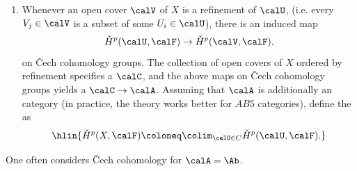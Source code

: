 \begin{definition}
\begin{enumerate}
        \item Whenever an open cover $\calV$ of $X$ is a refinement of $\calU$, (i.e. every $V_j \in \calV$ is a subset of some $U_i \in \calU$), there is an induced map 
        $$\check{H}^p(\calU, \calF) \to \check{H}^p(\calV, \calF).$$ 
        on \v{C}ech cohomology groups. The collection of open covers of $X$ ordered by refinement specifies a  $\calC$, and the above maps on \v{C}ech cohomology groups yields a  $\calC \to \calA$. Assuming that $\calA$ is additionally an  category (in practice, the theory works better for $AB5$ categories), define the  as 
        $$\hlin{\check{H}^p(X, \calF) \coloneq \colim_{\calU \in C} \check{H}^p(\calU, \calF).}$$
    \end{enumerate}
    One often considers \v{C}ech cohomology for $\calA = \Ab$. 
\end{definition}
